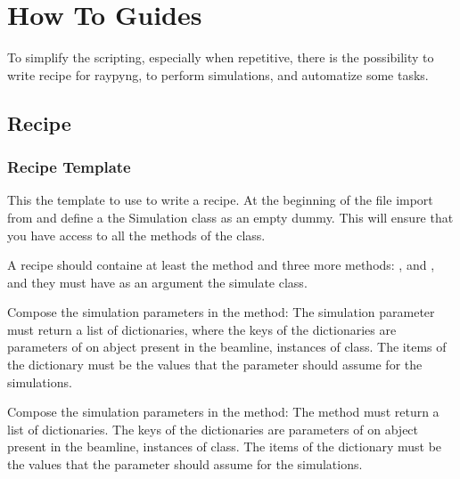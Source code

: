 \documentclass[letterpaper,10pt,english]{sphinxmanual}
\begin{document}
\sphinxstepscope


\chapter{How To Guides}
\label{\detokenize{how_to_guides:how-to-guides}}\label{\detokenize{how_to_guides::doc}}
\sphinxAtStartPar
To simplify the scripting, especially when repetitive,
there is the possibility to write recipe for raypyng, to
perform simulations, and automatize some tasks.


\section{Recipe}
\label{\detokenize{how_to_guides:recipe}}

\subsection{Recipe Template}
\label{\detokenize{how_to_guides:recipe-template}}
\sphinxAtStartPar
This the template to use to write a recipe.
At the beginning of the file import
 from 
and define a the Simulation class as an empty dummy.
This will ensure that you have access to all the methods of the
 class.

\sphinxAtStartPar
A recipe should containe at least the 
method and three more methods: ,
and ,
and they must have as an argument the simulate class.

\sphinxAtStartPar
Compose the simulation parameters in the  method:
The simulation parameter must return a list of dictionaries,
where the keys of the dictionaries are parameters of on abject
present in the beamline, instances of  class.
The items of the dictionary must be the values that the parameter should
assume for the simulations.

\sphinxAtStartPar
Compose the simulation parameters in the  method:
The  method must return a list of dictionaries.
The keys of the dictionaries are parameters of on abject
present in the beamline, instances of  class.
The items of the dictionary must be the values that the parameter should
assume for the simulations.
\end{document}
